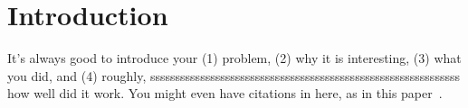 \chapter{Introduction}
\label{chap:intro}

It's always good to introduce your (1) problem, (2) why it is interesting, (3) what you did, and (4) roughly, ssssssssssssssssssssssssssssssssssssssssssssssssssssssssssssss
how well did it work. You might even have citations in here, as in this paper~\cite{Asawa:2008:TDT}.




